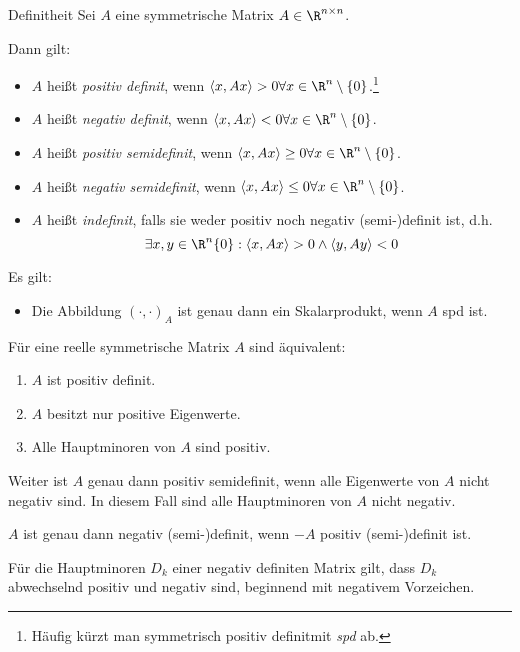 \documentclass[german]{../spicker}
\newcommand{\scalarprod}[1]{\left\langle #1 \right\rangle}
\begin{document}
\begin{defi}{Definitheit}
    Sei $A$ eine symmetrische Matrix $A \in \R^{n\times n}$.

    Dann gilt:
    \begin{itemize}
        \item $A$ heißt \emph{positiv definit}, wenn $\scalarprod{x, Ax} > 0 \forall x \in \R^n \setminus \{0\}$.\footnote{Häufig kürzt man \glqq symmetrisch positiv definit\grqq mit \emph{spd} ab.}
        \item $A$ heißt \emph{negativ definit}, wenn $\scalarprod{x, Ax} < 0 \forall x \in \R^n \setminus \{0\}$.
        \item $A$ heißt \emph{positiv semidefinit}, wenn $\scalarprod{x, Ax} \geq 0 \forall x \in \R^n \setminus \{0\}$.
        \item $A$ heißt \emph{negativ semidefinit}, wenn $\scalarprod{x, Ax} \leq 0 \forall x \in \R^n \setminus \{0\}$.
        \item $A$ heißt \emph{indefinit}, falls sie weder positiv noch negativ (semi-)definit ist, d.h.
              $$
                  \exists x, y \in \R^n \{0\} : \scalarprod{x, Ax} > 0 \land \scalarprod{y, Ay} < 0
              $$
    \end{itemize}

    Es gilt:
    \begin{itemize}
        \item Die Abbildung $(\cdot, \cdot)_A$ ist genau dann ein Skalarprodukt, wenn $A$ spd ist.
    \end{itemize}

    Für eine reelle symmetrische Matrix $A$ sind äquivalent:
    \begin{enumerate}
        \item $A$ ist positiv definit.
        \item $A$ besitzt nur positive Eigenwerte.
        \item Alle Hauptminoren von $A$ sind positiv.
    \end{enumerate}

    Weiter ist $A$ genau dann positiv semidefinit, wenn alle Eigenwerte von $A$ nicht negativ sind.
    In diesem Fall sind alle Hauptminoren von $A$ nicht negativ.

    $A$ ist genau dann negativ (semi-)definit, wenn $-A$ positiv (semi-)definit ist.

    Für die Hauptminoren $D_k$ einer negativ definiten Matrix gilt, dass $D_k$ abwechselnd positiv und negativ sind, beginnend mit negativem Vorzeichen.
\end{defi}

\printindex
\printindex[Beispiele]
\end{document}
